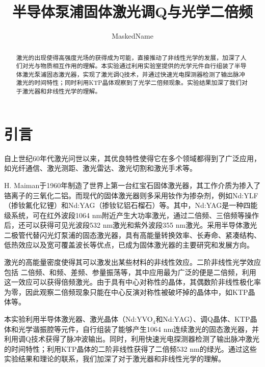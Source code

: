 \documentclass{mpltx}
\begin{document}
\title{半导体泵浦固体激光调Q与光学二倍频} %
\author{MaskedName} %
\date{}
\begin{abstract}
激光的出现使得高强度光场的获得成为可能，直接推动了非线性光学的发展，加深了人们对光与物质相互作用的理解。本实验通过利用实验室提供的光学元件自行组装了半导体激光泵浦固态激光器，实现了激光调Q技术，并通过快速光电探测器检测了输出脉冲激光的时间特性；同时利用KTP晶体观察到了光学二倍频现象。实验结果加深了我们对于激光器和非线性光学的理解。
\end{abstract}

\maketitle

\section{引言}
自上世纪60年代激光问世以来，其优良特性使得它在多个领域都得到了广泛应用，如光纤通信、激光测距、激光雷达、激光切割和激光手术等。

H. Maiman于1960年制造了世界上第一台红宝石固体激光器，其工作介质为掺入了铬离子的三氧化二铝。而现代的固体激光器则多采用钕作为掺杂剂，例如Nd:YLF（掺钕氟化钇锂）和Nd:YAG（掺钕钇铝石榴石）等。其中，Nd:YAG是一种四能级系统，可在红外波段1064 nm附近产生大功率激光，通过二倍频、三倍频等操作后，还可以获得可见光波段532 nm激光和紫外波段355 nm激光。采用半导体激光二极管代替闪光灯泵浦的固态激光器，具有高能量转换效率、长寿命、紧凑结构、低热效应以及宽可覆盖波长等优点，已成为固体激光器的主要研究和发展方向。\cite{wiki}

激光的高能量密度使得其可以激发出某些材料的非线性效应。二阶非线性光学效应包括
二倍频、和频、差频、参量振荡等，其中应用最为广泛的便是二倍频，利用这一效应可以获得倍频激光。由于具有中心对称性的晶体，其偶数阶非线性极化率为零，因此观察二倍频现象只能在中心反演对称性被破坏掉的晶体中，如KTP晶体等。

本实验利用半导体激光器、激光晶体（Nd:YVO$_4$和Nd:YAG）、调Q晶体、KTP晶体和光学谐振腔等元件，自行组装了能够产生1064 nm连续激光的固态激光器，并利用调Q技术获得了脉冲波输出。同时，利用快速光电探测器检测了输出脉冲激光的时间特性；利用KTP晶体的二阶非线性获得了二倍频532 nm的绿光。通过这些实验结果和理论的联系，我们加深了对于激光器和非线性光学的理解。
\end{document}
